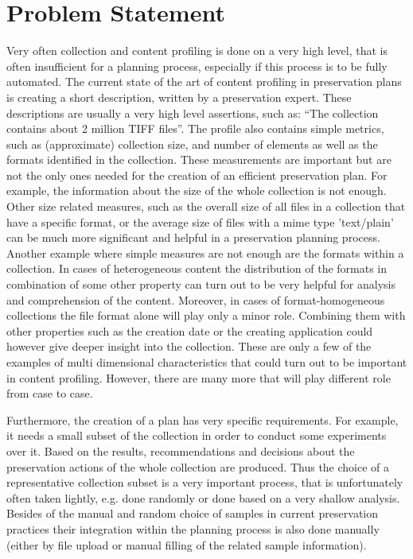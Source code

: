 \section{Problem Statement}
\label{sec:problem_statement}
Very often collection and content profiling is done on a very high level, that
is often insufficient for a planning process, especially if this process is to be fully automated.
The current state of the art of content profiling in preservation plans is creating a short description, written by a preservation expert. These descriptions are usually a very high level assertions, such as: ``The collection contains about 2 million TIFF files''. The profile also contains simple metrics, such as (approximate) collection size, and number of elements as well as the formats identified in the collection. 
These measurements are important but are not the only ones needed for the creation of an efficient preservation plan.
For example, the information about the size of the whole collection is not enough. Other size related measures, such as the overall size of all files in a collection that have a specific format, or the average size of files with a mime type 'text/plain' can be much more significant and helpful in a preservation planning process. Another example where simple measures are not enough are the formats within a collection. In cases of heterogeneous content the distribution of the formats in combination of some other property can turn out to be very helpful for analysis and comprehension of the content. Moreover, in cases of format-homogeneous collections the file format alone will play only a minor role. Combining them with other properties such as the creation date or the creating application could however give deeper insight into the collection.
These are only a few of the examples of multi dimensional characteristics that could turn out to be important in content profiling. However, there are many more that will play different role from case to case.

Furthermore, the creation of a plan has very specific requirements. For example, it needs a small subset of the collection in order to conduct some experiments over it. Based on the results, recommendations and decisions about the preservation actions of the whole collection are produced. Thus the choice of a representative collection subset is a very important process, that is unfortunately often taken lightly, e.g. done randomly or done based on a very shallow analysis. Besides of the manual and random choice of samples in current preservation practices their integration within the planning process is also done manually (either by file upload or manual filling of the related sample information).

